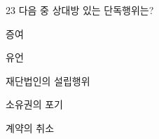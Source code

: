 \begin{question}{23}
다음 중 상대방 있는 단독행위는?
\begin{choices}
  \item 증여
  \item 유언
  \item 재단법인의 설립행위
  \item 소유권의 포기
  \item 계약의 취소
\end{choices}
\end{question}
